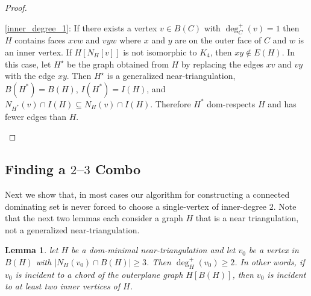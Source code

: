 \documentclass[12pt]{article}
\newtheorem{lem}{Lemma}
\theoremstyle{definition}
\begin{document}
\begin{proof}
\begin{compactenum}
    \item \cref{inner_degree_1}: If there exists a vertex $v\in B(C)$ with $\deg^+_C(v)=1$ then $H$ contains faces $xvw$ and $vyw$ where $x$ and $y$ are on the outer face of $C$ and $w$ is an inner vertex. If $H[N_H[v]]$ is not isomorphic to $K_4$, then $xy\not\in E(H)$.  In this case, let $H^\star$ be the graph obtained from $H$ by replacing the edges $xv$ and $vy$ with the edge $xy$. Then $H^\star$ is a generalized near-triangulation, $B(H^*)=B(H)$, $I(H^*)=I(H)$, and $N_{H^*}(v)\cap I(H)\subseteq N_{H}(v)\cap I(H)$.  Therefore $H^*$ dom-respects $H$ and has fewer edges than $H$. \qedhere
  \end{compactenum}
\end{proof}

\subsection{Finding a $2$--$3$ Combo}

Next we show that, in most cases our algorithm for constructing a connected dominating set is never forced to choose a single-vertex of inner-degree $2$. Note that the next two lemmas each consider a graph $H$ that is a near triangulation, not a generalized near-triangulation.

\begin{lem}\label{chord_incident}
  let $H$ be a dom-minimal near-triangulation and let $v_0$ be a vertex in $B(H)$ with $|N_H(v_0)\cap B(H)|\ge 3$.  Then $\deg^+_H(v_0)\ge 2$.  In other words, if $v_0$ is incident to a chord of the outerplane graph $H[B(H)]$, then $v_0$ is incident to at least two inner vertices of $H$.
\end{lem}
\end{document}
